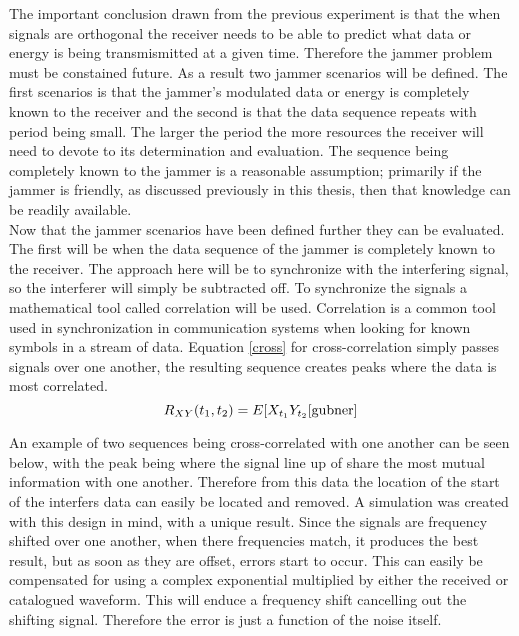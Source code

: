 The important conclusion drawn from the previous experiment is that the when signals are orthogonal the receiver needs to be able to predict what data or energy is being transmismitted at a given time.  Therefore the jammer problem must be constained future.  As a result two jammer scenarios will be defined.  The first scenarios is that the jammer's modulated data or energy is completely known to the receiver and the second is that the data sequence repeats with period being small.  The larger the period the more resources the receiver will need to devote to its determination and evaluation.  The sequence being completely known to the jammer is a reasonable assumption; primarily if the jammer is friendly, as discussed previously in this thesis, then that knowledge can be readily available.\\

Now that the jammer scenarios have been defined further they can be evaluated.  The first will be when the data sequence of the jammer is completely known to the receiver.  The approach here will be to synchronize with the interfering signal, so the interferer will simply be subtracted off.  To synchronize the signals a mathematical tool called correlation will be used.  Correlation is a common tool used in synchronization in communication systems when looking for known symbols in a stream of data.  Equation \ref{cross} for cross-correlation simply passes signals over one another, the resulting sequence creates peaks where the data is most correlated.\\

\begin{equation}\label{cross}
R_{XY}(t_{1},t_{2})=E[X_{t_{1}}Y_{t_{2}}\cite{gubner}
\end{equation}

An example of two sequences being cross-correlated with one another can be seen below, with the peak being where the signal line up of share the most mutual information with one another.  Therefore from this data the location of the start of the interfers data can easily be located and removed.  A simulation was created with this design in mind, with a unique result.  Since the signals are frequency shifted over one another, when there frequencies match, it produces the best result, but as soon as they are offset, errors start to occur.  This can easily be compensated for using a complex exponential multiplied by either the received or catalogued waveform.  This will enduce a frequency shift cancelling out the shifting signal.  Therefore the error is just a function of the noise itself.\\

